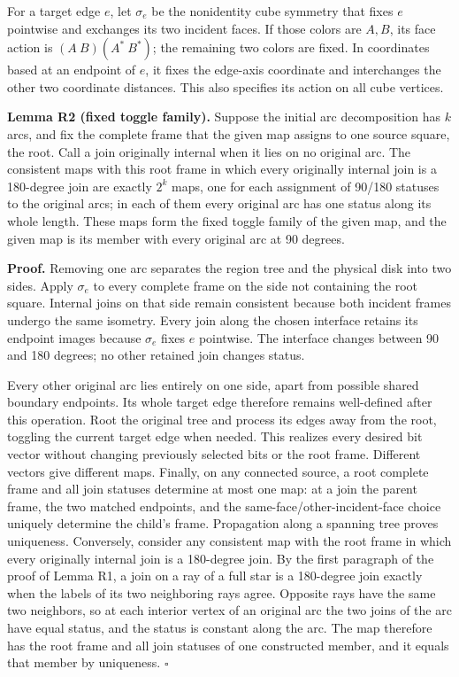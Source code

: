 \documentclass[
  11pt,
]{article}
\begin{document}
For a target edge \(e\), let \(\sigma_e\) be the nonidentity cube
symmetry that fixes \(e\) pointwise and exchanges its two incident
faces. If those colors are \(A,B\), its face action is
\((A\ B)(A^*\ B^*)\); the remaining two colors are fixed. In coordinates
based at an endpoint of \(e\), it fixes the edge-axis coordinate and
interchanges the other two coordinate distances. This also specifies its
action on all cube vertices.

\textbf{Lemma R2 (fixed toggle family).} Suppose the initial arc
decomposition has \(k\) arcs, and fix the complete frame that the given
map assigns to one source square, the root. Call a join originally
internal when it lies on no original arc. The consistent maps with this
root frame in which every originally internal join is a 180-degree join
are exactly \(2^k\) maps, one for each assignment of 90/180 statuses to
the original arcs; in each of them every original arc has one status
along its whole length. These maps form the fixed toggle family of the
given map, and the given map is its member with every original arc at 90
degrees.

\textbf{Proof.} Removing one arc separates the region tree and the
physical disk into two sides. Apply \(\sigma_e\) to every complete frame
on the side not containing the root square. Internal joins on that side
remain consistent because both incident frames undergo the same
isometry. Every join along the chosen interface retains its endpoint
images because \(\sigma_e\) fixes \(e\) pointwise. The interface changes
between 90 and 180 degrees; no other retained join changes status.

Every other original arc lies entirely on one side, apart from possible
shared boundary endpoints. Its whole target edge therefore remains
well-defined after this operation. Root the original tree and process
its edges away from the root, toggling the current target edge when
needed. This realizes every desired bit vector without changing
previously selected bits or the root frame. Different vectors give
different maps. Finally, on any connected source, a root complete frame
and all join statuses determine at most one map: at a join the parent
frame, the two matched endpoints, and the same-face/other-incident-face
choice uniquely determine the child's frame. Propagation along a
spanning tree proves uniqueness. Conversely, consider any consistent map
with the root frame in which every originally internal join is a
180-degree join. By the first paragraph of the proof of Lemma R1, a join
on a ray of a full star is a 180-degree join exactly when the labels of
its two neighboring rays agree. Opposite rays have the same two
neighbors, so at each interior vertex of an original arc the two joins
of the arc have equal status, and the status is constant along the arc.
The map therefore has the root frame and all join statuses of one
constructed member, and it equals that member by uniqueness. \(\square\)
\end{document}
